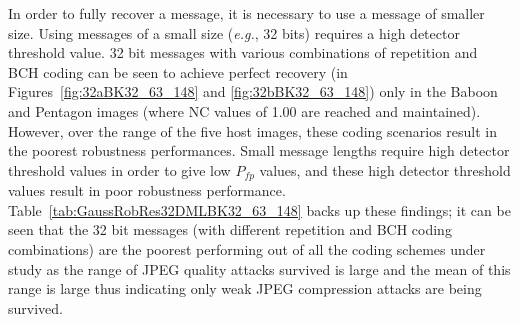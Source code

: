 \documentclass[12pt]{report}
\begin{document}
In order to fully recover a message, it is necessary to use a message of smaller size. 
Using messages of a small size
(\emph{e.g.}, 32 bits) requires a high detector threshold value.
32 bit messages with various combinations of repetition and BCH coding can be seen to achieve 
perfect recovery (in Figures~\ref{fig:32aBK32_63_148} and \ref{fig:32bBK32_63_148})
only in the Baboon and Pentagon images (where NC values of 1.00 are reached and maintained). 
However, over the range of the five host images,
these coding scenarios result in the poorest robustness performances. Small message lengths require 
high detector threshold values in order to give low $P_{fp}$ values, and these high detector threshold
values result in poor robustness performance. Table~\ref{tab:GaussRobRes32DMLBK32_63_148} backs up these findings;
it can be seen that the 32 bit messages (with different repetition and BCH coding combinations) are the poorest
performing out of all the coding schemes under study as the range of JPEG quality attacks survived is large and the
mean of this range is large thus indicating only weak JPEG compression attacks are being survived.
\end{document}
